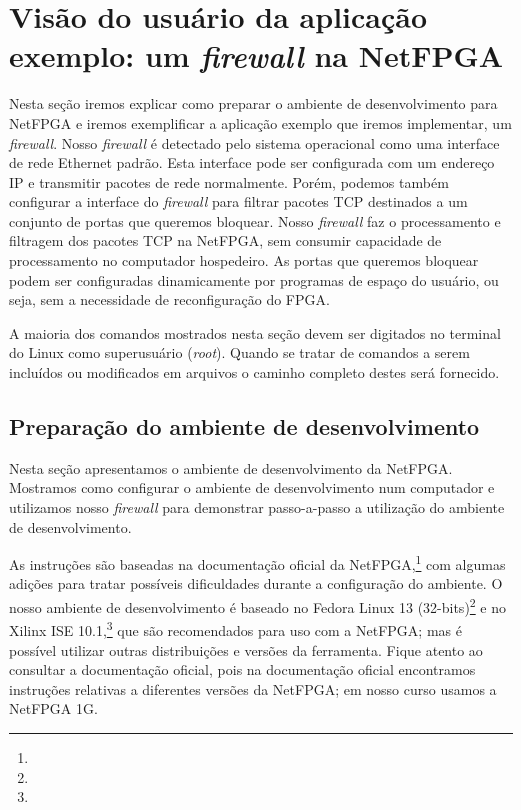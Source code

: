 \newpage
\section{Visão do usuário da aplicação exemplo: um \emph{firewall} na NetFPGA}
\label{sec:example}

Nesta seção iremos explicar como preparar o ambiente de
desenvolvimento para NetFPGA e iremos exemplificar a aplicação
exemplo que iremos implementar, um \emph{firewall}.  Nosso
\emph{firewall} é detectado pelo sistema operacional como uma
interface de rede Ethernet padrão.  Esta interface pode ser
configurada com um endereço IP e transmitir pacotes de rede
normalmente.  Porém, podemos também configurar a interface do
\emph{firewall} para filtrar pacotes TCP destinados a um conjunto de
portas que queremos bloquear.  Nosso \emph{firewall} faz o
processamento e filtragem dos pacotes TCP na NetFPGA, sem consumir
capacidade de processamento no computador hospedeiro.  As portas que
queremos bloquear podem ser configuradas dinamicamente por programas
de espaço do usuário, ou seja, sem a necessidade de reconfiguração
do FPGA.

A maioria dos comandos mostrados nesta seção devem ser digitados no
terminal do Linux como superusuário (\emph{root}).  Quando se tratar
de comandos a serem incluídos ou modificados em arquivos o caminho
completo destes será fornecido.

\subsection{Preparação do ambiente de desenvolvimento}

Nesta seção apresentamos o ambiente de desenvolvimento da NetFPGA.
Mostramos como configurar o ambiente de desenvolvimento num
computador e utilizamos nosso \emph{firewall} para demonstrar
passo-a-passo a utilização do ambiente de desenvolvimento.

As instruções são baseadas na documentação oficial da
NetFPGA,\footnote{}
com algumas adições para tratar possíveis dificuldades durante a
configuração do ambiente.  O nosso ambiente de desenvolvimento é
baseado no Fedora Linux 13
(32-bits)\footnote{}
e no Xilinx ISE
10.1,\footnote{}
que são recomendados para uso com a NetFPGA; mas é possível utilizar
outras distribuições e versões da ferramenta.  Fique atento ao
consultar a documentação oficial, pois na documentação oficial
encontramos instruções relativas a diferentes versões da NetFPGA; em
nosso curso usamos a NetFPGA 1G.

